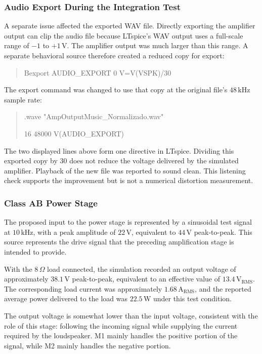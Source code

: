 \documentclass[conference]{IEEEtran}
\begin{document}
\subsubsection{Audio Export During the Integration Test}
A separate issue affected the exported WAV file. Directly exporting the amplifier output can clip the audio file because LTspice's WAV output uses a full-scale range of $-1$ to $+1\,\mathrm{V}$. The amplifier output was much larger than this range. A separate behavioral source therefore created a reduced copy for export:
\begin{quote}
\small\ttfamily
Bexport AUDIO\_EXPORT 0 V=V(VSPK)/30
\end{quote}
The export command was changed to use that copy at the original file's $48\,\mathrm{kHz}$ sample rate:
\begin{quote}
\small\ttfamily
.wave "AmpOutputMusic\_Normalizado.wav"\par
16 48000 V(AUDIO\_EXPORT)
\end{quote}
The two displayed lines above form one directive in LTspice. Dividing this exported copy by 30 does not reduce the voltage delivered by the simulated amplifier. Playback of the new file was reported to sound clean. This listening check supports the improvement but is not a numerical distortion measurement.

\subsubsection{Class AB Power Stage}
The proposed input to the power stage is represented by a sinusoidal test signal at $10\,\mathrm{kHz}$, with a peak amplitude of $22\,\mathrm{V}$, equivalent to $44\,\mathrm{V}$ peak-to-peak. This source represents the drive signal that the preceding amplification stage is intended to provide.

With the $8\,\Omega$ load connected, the simulation recorded an output voltage of approximately $38.1\,\mathrm{V}$ peak-to-peak, equivalent to an effective value of $13.4\,\mathrm{V_{RMS}}$. The corresponding load current was approximately $1.68\,\mathrm{A_{RMS}}$, and the reported average power delivered to the load was $22.5\,\mathrm{W}$ under this test condition.

The output voltage is somewhat lower than the input voltage, consistent with the role of this stage: following the incoming signal while supplying the current required by the loudspeaker. M1 mainly handles the positive portion of the signal, while M2 mainly handles the negative portion.
\end{document}
